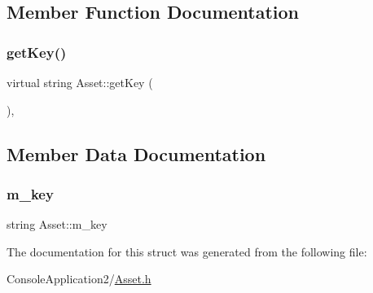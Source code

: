\subsection{Member Function Documentation}
\hypertarget{struct_asset_acadc9dc60e4a89d711de110327df094c}{}\label{struct_asset_acadc9dc60e4a89d711de110327df094c} 
\subsubsection{\texorpdfstring{get\+Key()}{getKey()}}
{\footnotesize\ttfamily virtual string Asset\+::get\+Key (\begin{DoxyParamCaption}{ }\end{DoxyParamCaption})\hspace{0.3cm}{\ttfamily [inline]}, {\ttfamily [virtual]}}



\subsection{Member Data Documentation}
\hypertarget{struct_asset_abc299be0e567c1c57a545ddc12a2e9dc}{}\label{struct_asset_abc299be0e567c1c57a545ddc12a2e9dc} 
\subsubsection{\texorpdfstring{m\+\_\+key}{m\_key}}
{\footnotesize\ttfamily string Asset\+::m\+\_\+key\hspace{0.3cm}{\ttfamily [protected]}}



The documentation for this struct was generated from the following file\+:\begin{DoxyCompactItemize}
\item 
Console\+Application2/\hyperlink{_asset_8h}{Asset.\+h}\end{DoxyCompactItemize}
